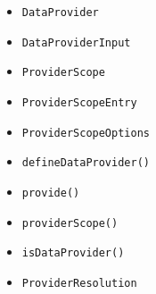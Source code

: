 \begin{itemize}
\tightlist
\item
  \texttt{D\allowbreak{}a\allowbreak{}t\allowbreak{}a\allowbreak{}P\allowbreak{}r\allowbreak{}o\allowbreak{}v\allowbreak{}i\allowbreak{}d\allowbreak{}e\allowbreak{}r}
\item
  \texttt{D\allowbreak{}a\allowbreak{}t\allowbreak{}a\allowbreak{}P\allowbreak{}r\allowbreak{}o\allowbreak{}v\allowbreak{}i\allowbreak{}d\allowbreak{}e\allowbreak{}r\allowbreak{}I\allowbreak{}n\allowbreak{}p\allowbreak{}u\allowbreak{}t}
\item
  \texttt{P\allowbreak{}r\allowbreak{}o\allowbreak{}v\allowbreak{}i\allowbreak{}d\allowbreak{}e\allowbreak{}r\allowbreak{}S\allowbreak{}c\allowbreak{}o\allowbreak{}p\allowbreak{}e}
\item
  \texttt{P\allowbreak{}r\allowbreak{}o\allowbreak{}v\allowbreak{}i\allowbreak{}d\allowbreak{}e\allowbreak{}r\allowbreak{}S\allowbreak{}c\allowbreak{}o\allowbreak{}p\allowbreak{}e\allowbreak{}E\allowbreak{}n\allowbreak{}t\allowbreak{}r\allowbreak{}y}
\item
  \texttt{P\allowbreak{}r\allowbreak{}o\allowbreak{}v\allowbreak{}i\allowbreak{}d\allowbreak{}e\allowbreak{}r\allowbreak{}S\allowbreak{}c\allowbreak{}o\allowbreak{}p\allowbreak{}e\allowbreak{}O\allowbreak{}p\allowbreak{}t\allowbreak{}i\allowbreak{}o\allowbreak{}n\allowbreak{}s}
\item
  \texttt{d\allowbreak{}e\allowbreak{}f\allowbreak{}i\allowbreak{}n\allowbreak{}e\allowbreak{}D\allowbreak{}a\allowbreak{}t\allowbreak{}a\allowbreak{}P\allowbreak{}r\allowbreak{}o\allowbreak{}v\allowbreak{}i\allowbreak{}d\allowbreak{}e\allowbreak{}r\allowbreak{}(\allowbreak{})}
\item
  \texttt{p\allowbreak{}r\allowbreak{}o\allowbreak{}v\allowbreak{}i\allowbreak{}d\allowbreak{}e\allowbreak{}(\allowbreak{})}
\item
  \texttt{p\allowbreak{}r\allowbreak{}o\allowbreak{}v\allowbreak{}i\allowbreak{}d\allowbreak{}e\allowbreak{}r\allowbreak{}S\allowbreak{}c\allowbreak{}o\allowbreak{}p\allowbreak{}e\allowbreak{}(\allowbreak{})}
\item
  \texttt{i\allowbreak{}s\allowbreak{}D\allowbreak{}a\allowbreak{}t\allowbreak{}a\allowbreak{}P\allowbreak{}r\allowbreak{}o\allowbreak{}v\allowbreak{}i\allowbreak{}d\allowbreak{}e\allowbreak{}r\allowbreak{}(\allowbreak{})}
\item
  \texttt{P\allowbreak{}r\allowbreak{}o\allowbreak{}v\allowbreak{}i\allowbreak{}d\allowbreak{}e\allowbreak{}r\allowbreak{}R\allowbreak{}e\allowbreak{}s\allowbreak{}o\allowbreak{}l\allowbreak{}u\allowbreak{}t\allowbreak{}i\allowbreak{}o\allowbreak{}n}

\end{itemize}
